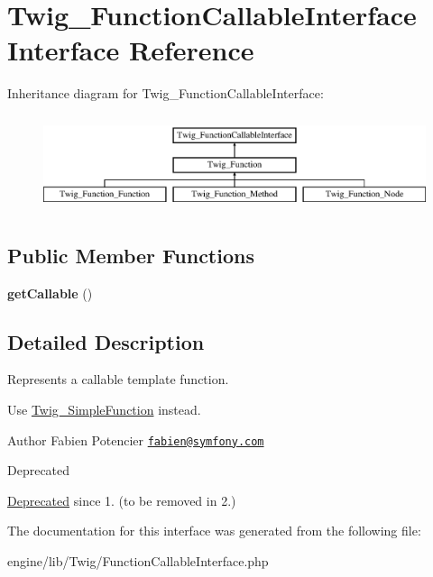 \hypertarget{interface_twig___function_callable_interface}{}\section{Twig\+\_\+\+Function\+Callable\+Interface Interface Reference}
\label{interface_twig___function_callable_interface}
Inheritance diagram for Twig\+\_\+\+Function\+Callable\+Interface\+:\begin{figure}[H]
\begin{center}
\leavevmode
\includegraphics[height=2.828283cm]{interface_twig___function_callable_interface}
\end{center}
\end{figure}
\subsection*{Public Member Functions}
\begin{DoxyCompactItemize}
\item 
\hypertarget{interface_twig___function_callable_interface_a0be839e0782a38a172c386bd963375c9}{}{\bfseries get\+Callable} ()\label{interface_twig___function_callable_interface_a0be839e0782a38a172c386bd963375c9}

\end{DoxyCompactItemize}


\subsection{Detailed Description}
Represents a callable template function.

Use \hyperlink{class_twig___simple_function}{Twig\+\_\+\+Simple\+Function} instead.

\begin{DoxyAuthor}{Author}
Fabien Potencier \href{mailto:fabien@symfony.com}{\tt fabien@symfony.\+com} 
\end{DoxyAuthor}
\begin{DoxyRefDesc}{Deprecated}
\item[\hyperlink{deprecated__deprecated000014}{Deprecated}]since 1. (to be removed in 2.) \end{DoxyRefDesc}


The documentation for this interface was generated from the following file\+:\begin{DoxyCompactItemize}
\item 
engine/lib/\+Twig/Function\+Callable\+Interface.\+php\end{DoxyCompactItemize}
